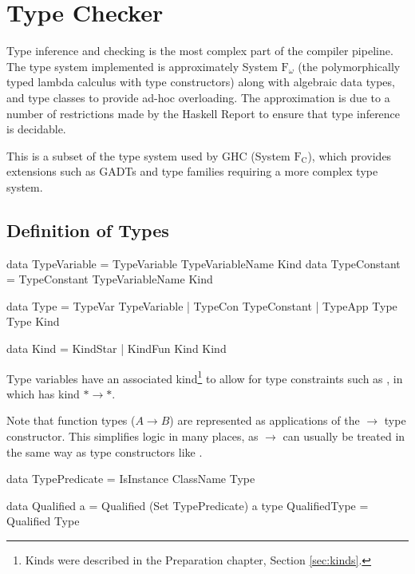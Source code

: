 \documentclass[dissertation.tex]{subfiles}
\begin{document}
\section{Type Checker}
{
    Type inference and checking is the most complex part of the compiler pipeline. The type system implemented is approximately System \(\text{F}_\omega\) (the polymorphically typed lambda calculus with type constructors) along with algebraic data types, and type classes to provide ad-hoc overloading. The approximation is due to a number of restrictions made by the Haskell Report to ensure that type inference is decidable.
    
    This is a subset of the type system used by GHC (System \(\text{F}_\text{C}\)), which provides extensions such as GADTs and type families requiring a more complex type system.

    \subsection{Definition of Types}
    {
        \begin{haskellfigure}
        data TypeVariable = TypeVariable TypeVariableName Kind
        data TypeConstant = TypeConstant TypeVariableName Kind

        data Type = TypeVar TypeVariable
                  | TypeCon TypeConstant
                  | TypeApp Type Type Kind

        data Kind = KindStar
                  | KindFun Kind Kind
        \end{haskellfigure}

        Type variables have an associated kind\footnote{Kinds were described in the Preparation chapter, Section \ref{sec:kinds}.} to allow for type constraints such as , in which  has kind \(*\rightarrow*\).

        Note that function types (\(A \rightarrow B\)) are represented as applications of the \(\rightarrow\) type constructor. This simplifies logic in many places, as \(\rightarrow\) can usually be treated in the same way as type constructors like .

        \begin{haskellfigure}
        data TypePredicate = IsInstance ClassName Type

        data Qualified a = Qualified (Set TypePredicate) a
        type QualifiedType = Qualified Type


\end{haskellfigure}}}
\end{document}
